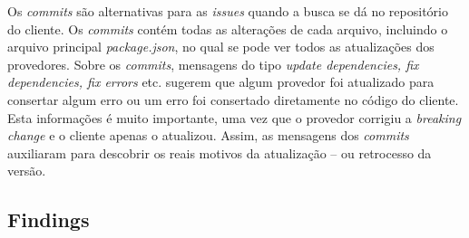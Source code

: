 Os \textit{commits} são alternativas para as \textit{issues} quando a busca se dá no repositório do cliente. Os \textit{commits} contém todas as alterações de cada arquivo, incluindo o arquivo principal \textit{package.json}, no qual se pode ver todos as atualizações dos provedores. Sobre os \textit{commits}, mensagens do tipo \textit{update dependencies, fix dependencies, fix errors} etc. sugerem que algum provedor foi atualizado para consertar algum erro ou um erro foi consertado diretamente no código do cliente. Esta informações é muito importante, uma vez que o provedor corrigiu a \textit{breaking change} e o cliente apenas o atualizou. Assim, as mensagens dos \textit{commits} auxiliaram para descobrir os reais motivos da atualização -- ou retrocesso da versão.

\subsection{Findings}
\label{fin:rq3}